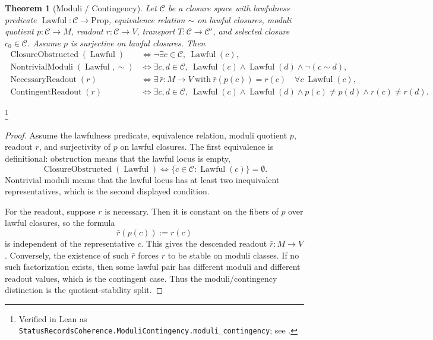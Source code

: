 \documentclass[11pt]{article}
\newtheorem{theorem}{Theorem}[section]
\theoremstyle{definition}
\begin{document}
\begin{theorem}[Moduli / Contingency]\label{thm:F26}
Let \(\mathcal C\) be a closure space with lawfulness predicate
\(\operatorname{Lawful}:\mathcal C\to\mathrm{Prop}\), equivalence relation
\(\sim\) on lawful closures, moduli quotient
\(p:\mathcal C\to M\), readout \(r:\mathcal C\to V\), transport
\(T:\mathcal C\to\mathcal C'\), and selected closure
\(c_0\in\mathcal C\).  Assume \(p\) is surjective on lawful
closures.  Then
\begin{align*}
  \operatorname{ClosureObstructed}(\operatorname{Lawful})
  &\iff
  \neg\exists c\in\mathcal C,\ \operatorname{Lawful}(c),\\
  \operatorname{NontrivialModuli}(\operatorname{Lawful},\sim)
  &\iff
  \exists c,d\in\mathcal C,\,
    \operatorname{Lawful}(c)\wedge\operatorname{Lawful}(d)
    \wedge \neg(c\sim d),\\
  \operatorname{NecessaryReadout}(r)
  &\iff
  \exists\,\bar r:M\to V\ \text{with}\
    \bar r(p(c))=r(c)\quad
    \forall c\ \operatorname{Lawful}(c),\\
  \operatorname{ContingentReadout}(r)
  &\iff
  \exists c,d\in\mathcal C,\,
    \operatorname{Lawful}(c)\wedge\operatorname{Lawful}(d)
    \wedge p(c)\ne p(d)\wedge r(c)\ne r(d).
\end{align*}
\end{theorem}
\footnote{\raggedright Verified in Lean as
\texttt{StatusRecordsCoherence.ModuliContingency.\allowbreak{}moduli\_contingency};
see \Cref{app:formalization}.}
\begin{proof}
Assume the lawfulness predicate, equivalence relation, moduli quotient
\(p\), readout \(r\), and surjectivity of \(p\) on lawful closures.
The first equivalence is definitional: obstruction means that the
lawful locus is empty,
\[
  \operatorname{ClosureObstructed}(\operatorname{Lawful})
  \Longleftrightarrow
  \{c\in\mathcal C:\operatorname{Lawful}(c)\}=\emptyset.
\]
Nontrivial moduli means that the lawful locus has at least two
inequivalent representatives, which is the second displayed
condition.

For the readout, suppose \(r\) is necessary.  Then it is constant on
the fibers of \(p\) over lawful closures, so the formula
\[
  \bar r(p(c)):=r(c)
\]
is independent of the representative \(c\).  This gives the descended
readout \(\bar r:M\to V\).  Conversely, the existence of such
\(\bar r\) forces \(r\) to be stable on moduli classes.  If no such
factorization exists, then some lawful pair has different moduli and
different readout values, which is the contingent case.  Thus the
moduli/contingency distinction is the quotient-stability split.
\end{proof}
\end{document}

